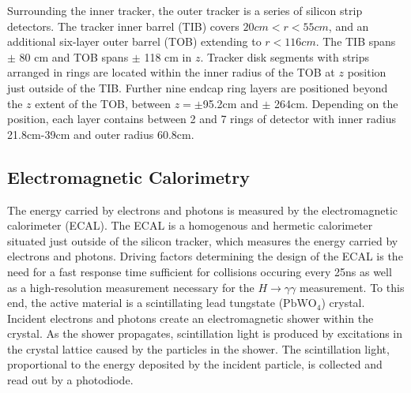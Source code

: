 
Surrounding the inner tracker, the outer tracker is a series of silicon strip detectors. The tracker inner barrel (TIB) covers $20 cm < r < 55 cm$, and an additional six-layer outer barrel (TOB) extending to $r<116cm$.  The TIB spans $\pm$ 80 cm and TOB spans $\pm$ 118 cm in $z$. 
Tracker disk segments with strips arranged in rings are located within the inner radius of the TOB at $z$ position just outside of the TIB. Further nine endcap ring layers are positioned beyond the $z$ extent of the TOB, between $z=\pm$95.2cm and $\pm$ 264cm. Depending on the position, each layer contains between 2 and 7 rings of detector with inner radius 21.8cm-39cm and outer radius 60.8cm.




\subsection{Electromagnetic Calorimetry}\label{ch:cms:ecal}
The energy carried by electrons and photons is measured by the electromagnetic calorimeter (ECAL). The ECAL is a homogenous and hermetic calorimeter situated just outside of the silicon tracker, which measures the energy carried by electrons and photons.
Driving factors determining the design of the ECAL is the need for a fast response time sufficient for collisions occuring every 25ns as well as a high-resolution measurement necessary for the $H\rightarrow \gamma \gamma$ measurement. To this end, the active material is a scintillating lead tungstate ($\mathrm{PbWO_4}$) crystal. Incident electrons and photons create an electromagnetic shower within the crystal. As the shower propagates, scintillation light is produced by excitations in the crystal lattice caused by the particles in the shower. The scintillation light, proportional to the energy deposited by the incident particle, is collected and read out by a photodiode\cite{CERN-LHCC-97-033}.



